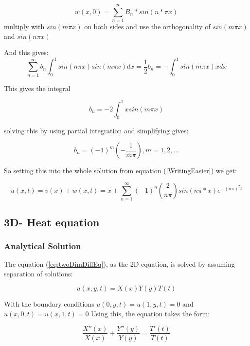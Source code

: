 \documentclass[a4paper,10pt]{article}
\begin{document}
\begin{equation}
 w(x,0) = \sum_{n=1}^{\infty} B_n*sin(n*\pi x)
\end{equation}
multiply with $sin(m\pi x)$ on both sides and use the orthogonality of $sin(m\pi x)$  and $sin(n\pi x)$

And this gives:
\begin{equation}
 \sum_{n=1}^{\infty} b_n \int_0^1 sin(n\pi x)sin(m\pi x)dx = \frac{1}{2}b_n = -\int_0^1 sin(m\pi x)x dx
\end{equation}

This gives the integral

\begin{equation}
 b_n = -2\int_0^1 xsin(m\pi x)
\end{equation}

solving this by using partial integration and simplifying gives:

\begin{equation}
 b_n = (-1)^m(-\frac{1}{m\pi})		, m=1,2,...
\end{equation}

So setting this into the whole solution from equation (\ref{WritingEasier}) we get:

\begin{equation}
 u(x,t) = v(x) + w(x,t) = 
 x + \sum_{n=1}^{\infty}(-1)^n(\frac{2}{n\pi})sin(n\pi*x)e^{-(n\pi)^2t}
\end{equation}

\subsection{3D- Heat equation}
\subsubsection{Analytical Solution}
The equation (\ref{eq:twoDimDiffEq}), as the 2D equation, is solved by assuming separation of solutions:

\begin{equation}
 u(x,y,t) = X(x)Y(y)T(t)
\end{equation}

With the boundary conditions $u(0,y,t) = u(1,y,t) = 0$ and $u(x,0,t) = u(x,1,t) = 0$
Using this, the equation takes the form:

\begin{equation}
 \frac{X''(x)}{X(x)} + \frac{Y''(y)}{Y(y)} = \frac{T'(t)}{T(t)} 
\end{equation}
\end{document}
